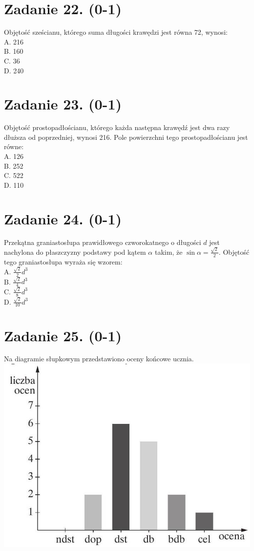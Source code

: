 \documentclass[10pt]{article}
\begin{document}
\section*{Zadanie 22. (0-1)}
Objętość sześcianu, którego suma długości krawędzi jest równa 72, wynosi:\\
A. 216\\
B. 160\\
C. 36\\
D. 240

\section*{Zadanie 23. (0-1)}
Objętość prostopadłościanu, którego każda następna krawędź jest dwa razy dłuższa od poprzedniej, wynosi 216. Pole powierzchni tego prostopadłościanu jest równe:\\
A. 126\\
B. 252\\
C. 522\\
D. 110

\section*{Zadanie 24. (0-1)}
Przekątna graniastosłupa prawidłowego czworokatnego o długości \(d\) jest nachylona do płaszczyzny podstawy pod kątem \(\alpha\) takim, że \(\sin \alpha=\frac{\sqrt{2}}{2}\). Objętość tego graniastosłupa wyraża się wzorem:\\
A. \(\frac{\sqrt{2}}{2} d^{3}\)\\
B. \(\frac{\sqrt{2}}{4} d^{3}\)\\
C. \(\frac{\sqrt{2}}{8} d^{3}\)\\
D. \(\frac{\sqrt{2}}{10} d^{3}\)

\section*{Zadanie 25. (0-1)}
Na diagramie słupkowym przedstawiono oceny końcowe ucznia.\\
\includegraphics[max width=\textwidth, center]{2024_11_21_cdea326d19d0c2132b88g-08}
\end{document}
